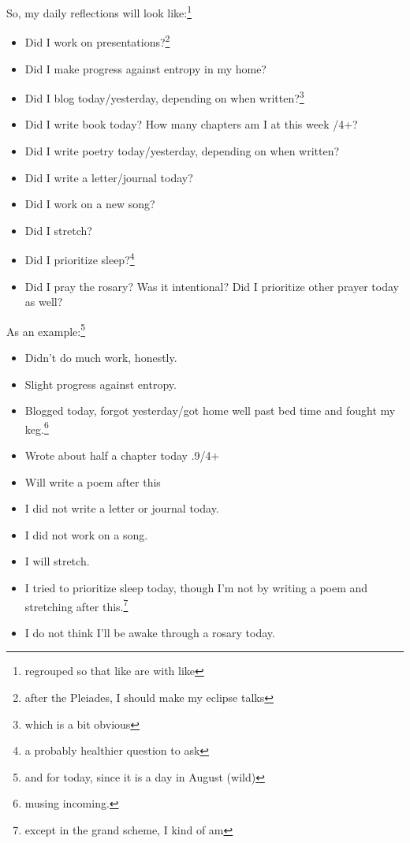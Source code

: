 \documentclass[12pt]{article}[titlepage]
\renewcommand{\,}{\textsuperscript{,}}
\begin{document}
So, my daily reflections will look like:\footnote{regrouped so that like are with like}
\begin{itemize}
\item Did I work on presentations?\footnote{after the Pleiades, I should make my eclipse talks}
\item Did I make progress against entropy in my home?
\item Did I blog today/yesterday, depending on when written?\footnote{which is a bit obvious}
\item Did I write book today? How many chapters am I at this week /4+?
\item Did I write poetry today/yesterday, depending on when written?
\item Did I write a letter/journal today?
\item Did I work on a new song?
\item Did I stretch?
\item Did I prioritize sleep?\footnote{a probably healthier question to ask}
\item Did I pray the rosary? Was it intentional? Did I prioritize other prayer today as well?
\end{itemize}

As an example:\footnote{and for today, since it is a day in August (wild)}
\begin{itemize}
\item Didn't do much work, honestly.
\item Slight progress against entropy.
\item Blogged today, forgot yesterday/got home well past bed time and fought my keg.\footnote{musing incoming.}
\item Wrote about half a chapter today .9/4+
\item Will write a poem after this
\item I did not write a letter or journal today.
\item I did not work on a song.
\item I will stretch.
\item I tried to prioritize sleep today, though I'm not by writing a poem and stretching after this.\footnote{except in the grand scheme, I kind of am}
\item I do not think I'll be awake through a rosary today.
\end{itemize}
\end{document}
